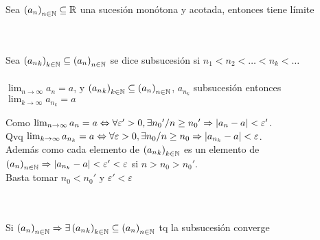\documentclass[a4paper,10pt]{article}
\begin{document}
\fi
\hspace*{\fill} \\
\hspace*{\fill} \\
\propiedad Sea $\defsucesion{a} \subseteq \mathbb{R}$ una sucesión monótona y acotada, entonces tiene límite
\ifversionlarga
\begin{demo}
	
\end{demo}
\fi
\hspace*{\fill} \\
\hspace*{\fill} \\
 Sea $\defsucesion[k]{a_n} \subseteq \defsucesion{a}$ se dice subsucesión si $n_1 < n_2 < \dots < n_k < \dots$
\\ \\
\propiedad $\lim_{n \to \infty} {a_n} = a$, y $\defsucesion[k]{a_n} \subseteq \defsucesion{a}$, $a_{n_k}$ subsucesión entonces $\lim_{k \to \infty} a_{n_k} = a$ 
\ifversionlarga
\begin{demo}
	Como $\lim_{n \to \infty} a_{n} = a \Leftrightarrow \forall \varepsilon' > 0, \exists {n_0}' / n \geq {n_0}' \Rightarrow \abs{a_n - a} < \varepsilon'$. \\
	Qvq $\lim_{k \to \infty} a_{n_k} = a \Leftrightarrow \forall \varepsilon > 0, \exists n_0 / n \geq n_0 \Rightarrow \abs{a_{n_k}-a} < \varepsilon$. \\
	Además como cada elemento de $\defsucesion[k]{a_n}$ es un elemento de $\defsucesion{a} \Rightarrow \abs{a_{n_k} - a} < \varepsilon' < \varepsilon$ si $n > n_0 > n_0'$.\\
	Basta tomar $n_0 < {n_0}'$ y $\varepsilon' < \varepsilon$
\end{demo}
\fi
\hspace*{\fill} \\
\hspace*{\fill} \\
 Si $\defsucesion{a} \Rightarrow \exists \defsucesion[k]{a_n} \subseteq \defsucesion{a}$ tq la subsucesión converge
\end{document}
